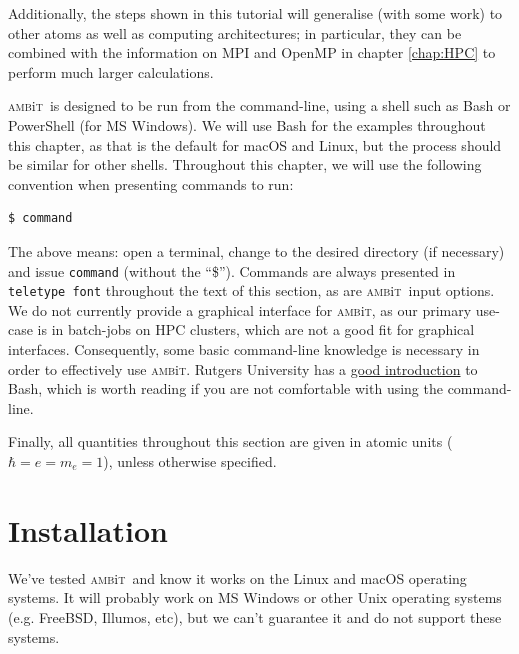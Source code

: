 \documentclass{report}
\newcommand{\ambit}{\textsc{amb}{\footnotesize i}\textsc{t}}
\begin{document}
Additionally, the steps shown in this tutorial will generalise
(with some work) to other atoms as well as computing architectures; in particular, they can be
combined with the information on MPI and OpenMP in chapter \ref{chap:HPC} to perform much larger
calculations.

\ambit\  is designed to be run from the command-line, using a shell such as Bash or PowerShell (for MS
Windows). We will
use Bash for the examples throughout this chapter, as that is the default for macOS and Linux, but the
process should be similar for other shells. Throughout this chapter, we will use the following
convention when presenting commands to run:

\begin{verbatim}
$ command
\end{verbatim}

The above means: open a terminal, change to the desired directory (if necessary) and issue
\texttt{command} (without the ``\$''). Commands are always presented in \texttt{teletype font}
throughout the text of this section, as are \ambit\  input options. We do not currently provide a 
graphical interface for \ambit, as our primary use-case is in batch-jobs on HPC clusters, which are not
a good fit for graphical interfaces. Consequently, some basic command-line knowledge is necessary in
order to effectively use \ambit. Rutgers University has a
\href{http://linuxcourse.rutgers.edu/documents/Bash-Beginners-Guide/}{good introduction} to Bash, which
is worth reading if you are not comfortable with using the command-line.

Finally, all quantities throughout this section are given in atomic units ($\hbar = e = m_e = 1$), 
unless otherwise specified.

\section{Installation}

We've tested \ambit\  and know it works on the Linux and macOS operating systems. It will probably work
on MS Windows or other Unix operating systems (e.g. FreeBSD, Illumos, etc), but we can't guarantee it
and do not support these systems. 
\end{document}
